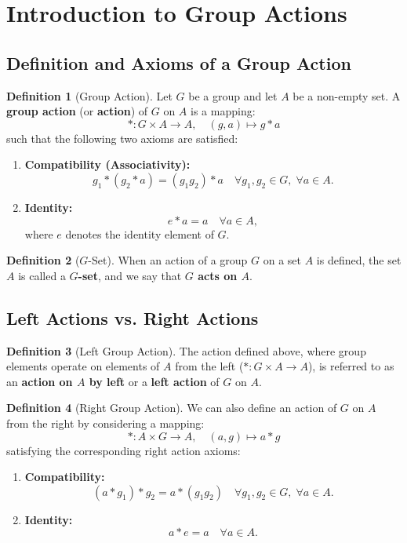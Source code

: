 \documentclass[12pt]{article}
\theoremstyle{definition}
\newtheorem{definition}{Definition}[section]
\theoremstyle{plain}
\begin{document}
\newpage
\section{Introduction to Group Actions}

\subsection{Definition and Axioms of a Group Action}

\begin{definition}[Group Action]
Let $G$ be a group and let $A$ be a non-empty set. A \textbf{group action} (or \textbf{action}) of $G$ on $A$ is a mapping:
\[
*: G \times A \to A, \quad (g, a) \mapsto g * a
\]
such that the following two axioms are satisfied:
\begin{enumerate}
    \item \textbf{Compatibility (Associativity):}
    \[
    g_1 * (g_2 * a) = (g_1 g_2) * a \quad \forall g_1, g_2 \in G, \; \forall a \in A.
    \]
    \item \textbf{Identity:}
    \[
    e * a = a \quad \forall a \in A,
    \]
    where $e$ denotes the identity element of $G$.
\end{enumerate}
\end{definition}

\begin{definition}[$G$-Set]
When an action of a group $G$ on a set $A$ is defined, the set $A$ is called a \textbf{$G$-set}, and we say that \textbf{$G$ acts on $A$}.
\end{definition}

\subsection{Left Actions vs. Right Actions}

\begin{definition}[Left Group Action]
The action defined above, where group elements operate on elements of $A$ from the left ($*: G \times A \to A$), is referred to as an \textbf{action on $A$ by left} or a \textbf{left action} of $G$ on $A$.
\end{definition}

\begin{definition}[Right Group Action]
We can also define an action of $G$ on $A$ from the right by considering a mapping:
\[
*: A \times G \to A, \quad (a, g) \mapsto a * g
\]
satisfying the corresponding right action axioms:
\begin{enumerate}
    \item \textbf{Compatibility:}
    \[
    (a * g_1) * g_2 = a * (g_1 g_2) \quad \forall g_1, g_2 \in G, \; \forall a \in A.
    \]
    \item \textbf{Identity:}
    \[
    a * e = a \quad \forall a \in A.
    \]
\end{enumerate}
\end{definition}
\end{document}
